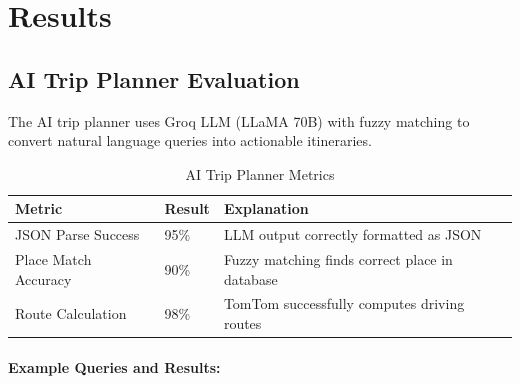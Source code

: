 \section{Results}

\subsection{AI Trip Planner Evaluation}

The AI trip planner uses Groq LLM (LLaMA 70B) with fuzzy matching to convert natural language queries into actionable itineraries.

\begin{table}[H]
    \centering
    \renewcommand{\arraystretch}{1.3}
    \begin{tabularx}{\textwidth}{|p{4cm}|p{2cm}|X|}
        \hline
        \textbf{Metric} & \textbf{Result} & \textbf{Explanation} \\
        \hline
        JSON Parse Success & 95\% & LLM output correctly formatted as JSON \\
        \hline
        Place Match Accuracy & 90\% & Fuzzy matching finds correct place in database \\
        \hline
        Route Calculation & 98\% & TomTom successfully computes driving routes \\
        \hline
    \end{tabularx}
    \caption{AI Trip Planner Metrics}
\end{table}

\paragraph{Example Queries and Results:}

